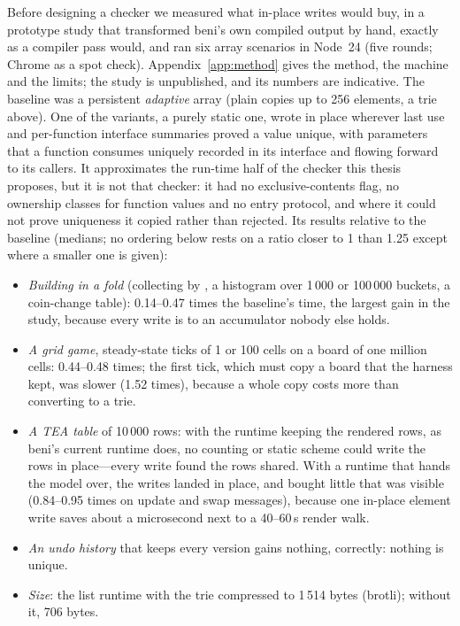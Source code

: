 Before designing a checker we measured what in-place writes would buy, in a prototype study that
transformed beni's own compiled output by hand, exactly as a compiler pass would, and ran six array
scenarios in Node~24 (five rounds; Chrome as a spot check). Appendix~\ref{app:method} gives the
method, the machine and the limits; the study is unpublished, and its numbers are indicative. The
baseline was a persistent
\emph{adaptive} array (plain copies up to 256 elements, a trie above). One of the variants, a purely
static one, wrote in place wherever last use and per-function interface summaries proved a value
unique, with parameters that a function consumes uniquely recorded in its interface and flowing
forward to its callers. It approximates the run-time half of the checker this thesis proposes, but
it is not that checker: it had no exclusive-contents flag, no ownership classes for function values
and no entry protocol, and where it could not prove uniqueness it copied rather than rejected. Its
results relative to the baseline (medians; no ordering below rests on a ratio closer to 1 than 1.25
except where a smaller one is given):

\begin{itemize}
\item \emph{Building in a fold} (collecting by , a histogram over 1\,000 or 100\,000
buckets, a coin-change table): 0.14--0.47 times the baseline's time, the largest gain in the study,
because every write is to an accumulator nobody else holds.
\item \emph{A grid game}, steady-state ticks of 1 or 100 cells on a board of one million cells:
0.44--0.48 times; the first tick, which must copy a board that the harness kept, was slower
(1.52 times), because a whole copy costs more than converting to a trie.
\item \emph{A TEA table} of 10\,000 rows: with the runtime keeping the rendered rows, as beni's
current runtime does, no counting or static scheme could write the rows in place---every write
found the rows shared. With a runtime that hands the model over, the writes landed in place, and
bought little that was visible (0.84--0.95 times on update and swap messages), because one in-place
element write saves about a microsecond next to a 40--60\,\textmu s render walk.
\item \emph{An undo history} that keeps every version gains nothing, correctly: nothing is unique.
\item \emph{Size}: the list runtime with the trie compressed to 1\,514 bytes (brotli); without it,
706 bytes.
\end{itemize}

